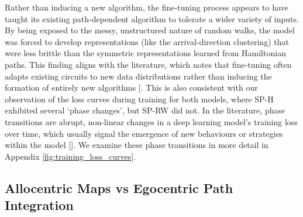 Rather than inducing a new algorithm, the fine-tuning process appears to have taught its existing path-dependent algorithm to tolerate a wider variety of inputs. By being exposed to the messy, unstructured nature of random walks, the model was forced to develop representations (like the arrival-direction clustering) that were less brittle than the symmetric representations learned from Hamiltonian paths. This finding aligns with the literature, which notes that fine-tuning often adapts existing circuits to new data distributions rather than inducing the formation of entirely new algorithms [\cite{prakash2024finetuning}. This is also consistent with our observation of the loss curves during training for both models, where SP-H exhibited several `phase changes', but SP-RW did not. In the literature, phase transitions are abrupt, non-linear changes in a deep learning model's training loss over time, which usually signal the emergence of new behaviours or strategies within the model [\cite{chen2025suddendropsloss}]. We examine these phase transitions in more detail in Appendix \ref{fig:training_loss_curves}.


\subsection{Allocentric Maps vs Egocentric Path Integration}

